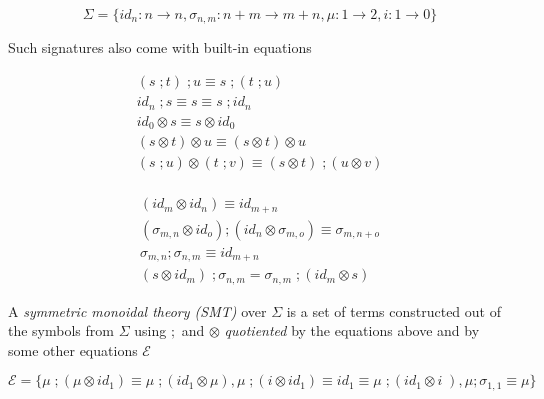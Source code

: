 \documentclass[aspectratio=169]{beamer}
\begin{document}
\begin{frame}{}
  
\small

\[
\Sigma = \{id_n : n \to n,\sigma_{n,m} : n + m \to m + n,\mu : 1 \to 2, i : 1 \to 0\}
\]
 
Such signatures also come with \alert{built-in} equations


\begin{minipage}[c][][c]{0.45\textwidth}
\begin{align*}    
(s\;;t)\;;u \equiv s\;;(t\;;u)\\
id_{n}\;;s \equiv s \equiv s\;;id_{n}\\
id_{0} \otimes s \equiv s \otimes id_{0}\\
(s \otimes t) \otimes u \equiv (s \otimes t) \otimes u\\
(s\;;u) \otimes (t\;;v) \equiv (s \otimes t)\;;(u \otimes v)\\
\end{align*}
\end{minipage}
\hfill
\begin{minipage}[c][][c]{0.45\textwidth}
\begin{align*}
(id_{m} \otimes id_{n}) \equiv id_{m + n}\\
(\sigma_{m,n} \otimes id_{o});(id_{n} \otimes \sigma_{m,o}) \equiv \sigma_{m,n+o}\\
\sigma_{m,n} ; \sigma_{n,m} \equiv id_{m+n}\\
(s \otimes id_{m})\;; \sigma_{n,m} = \sigma_{n,m}\;; (id_{m} \otimes s)
\end{align*}    
\end{minipage}

\vspace{-1.5em}

A \textit{symmetric monoidal theory (SMT)} over $\Sigma$ is a set of terms constructed out of the symbols from $\Sigma$ using $;$ and $\otimes$ \textit{quotiented} by the equations above and by some other equations $\mathcal{E}$

\begin{example}
    \[
        \mathcal{E} = \{ \mu \;; (\mu \otimes id_{1}) \equiv \mu \;; (id_{1} \otimes \mu), \mu \;; (i \otimes id_{1}) \equiv id_{1} \equiv \mu\;;(id_{1} \otimes i\;), \mu;\sigma_{1,1} \equiv \mu \}  
    \]
\end{example}

\end{frame}
\end{document}
